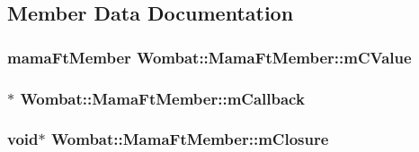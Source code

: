 \subsection{Member Data Documentation}
\hypertarget{classWombat_1_1MamaFtMember_ab76b5c8785b2ed7d41e857db76a56686}{
\subsubsection[{mCValue}]{\setlength{\rightskip}{0pt plus 5cm}mamaFtMember {\bf Wombat::MamaFtMember::mCValue}}}
\label{classWombat_1_1MamaFtMember_ab76b5c8785b2ed7d41e857db76a56686}
\hypertarget{classWombat_1_1MamaFtMember_a6d4a2f7d451434979bd7f7d69408bdae}{
\subsubsection[{mCallback}]{$\ast$ {\bf Wombat::MamaFtMember::mCallback}}}
\label{classWombat_1_1MamaFtMember_a6d4a2f7d451434979bd7f7d69408bdae}
\hypertarget{classWombat_1_1MamaFtMember_aabab786509f1b5c07ee3ea9da4355b5e}{
\subsubsection[{mClosure}]{\setlength{\rightskip}{0pt plus 5cm}void$\ast$ {\bf Wombat::MamaFtMember::mClosure}}}
\label{classWombat_1_1MamaFtMember_aabab786509f1b5c07ee3ea9da4355b5e}
